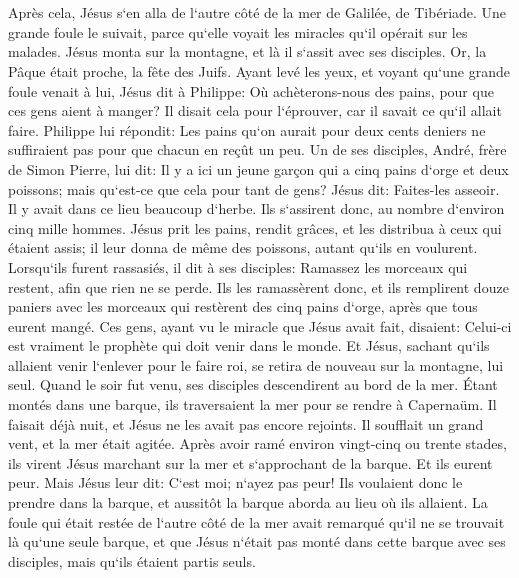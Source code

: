 \chapter{}

\verse Après cela, Jésus s`en alla de l`autre côté de la mer de Galilée, de Tibériade. 
\verse Une grande foule le suivait, parce qu`elle voyait les miracles qu`il opérait sur les malades. 
\verse Jésus monta sur la montagne, et là il s`assit avec ses disciples. 
\verse Or, la Pâque était proche, la fête des Juifs. 
\verse Ayant levé les yeux, et voyant qu`une grande foule venait à lui, Jésus dit à Philippe: Où achèterons-nous des pains, pour que ces gens aient à manger? 
\verse Il disait cela pour l`éprouver, car il savait ce qu`il allait faire. 
\verse Philippe lui répondit: Les pains qu`on aurait pour deux cents deniers ne suffiraient pas pour que chacun en reçût un peu. 
\verse Un de ses disciples, André, frère de Simon Pierre, lui dit: 
\verse Il y a ici un jeune garçon qui a cinq pains d`orge et deux poissons; mais qu`est-ce que cela pour tant de gens? 
\verse Jésus dit: Faites-les asseoir. Il y avait dans ce lieu beaucoup d`herbe. Ils s`assirent donc, au nombre d`environ cinq mille hommes. 
\verse Jésus prit les pains, rendit grâces, et les distribua à ceux qui étaient assis; il leur donna de même des poissons, autant qu`ils en voulurent. 
\verse Lorsqu`ils furent rassasiés, il dit à ses disciples: Ramassez les morceaux qui restent, afin que rien ne se perde. 
\verse Ils les ramassèrent donc, et ils remplirent douze paniers avec les morceaux qui restèrent des cinq pains d`orge, après que tous eurent mangé. 
\verse Ces gens, ayant vu le miracle que Jésus avait fait, disaient: Celui-ci est vraiment le prophète qui doit venir dans le monde. 
\verse Et Jésus, sachant qu`ils allaient venir l`enlever pour le faire roi, se retira de nouveau sur la montagne, lui seul. 
\verse Quand le soir fut venu, ses disciples descendirent au bord de la mer. 
\verse Étant montés dans une barque, ils traversaient la mer pour se rendre à Capernaüm. Il faisait déjà nuit, et Jésus ne les avait pas encore rejoints. 
\verse Il soufflait un grand vent, et la mer était agitée. 
\verse Après avoir ramé environ vingt-cinq ou trente stades, ils virent Jésus marchant sur la mer et s`approchant de la barque. Et ils eurent peur. 
\verse Mais Jésus leur dit: C`est moi; n`ayez pas peur! 
\verse Ils voulaient donc le prendre dans la barque, et aussitôt la barque aborda au lieu où ils allaient. 
\verse La foule qui était restée de l`autre côté de la mer avait remarqué qu`il ne se trouvait là qu`une seule barque, et que Jésus n`était pas monté dans cette barque avec ses disciples, mais qu`ils étaient partis seuls. 
